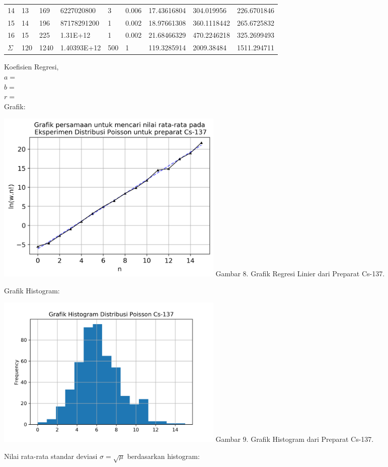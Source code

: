 \documentclass{article}
\begin{document}
\begin{longtable}{@{}lllllllll@{}}
				14  & 13  & 169                  & 6227020800  & 3   & 0.006 & 17.43616804  & 304.019956                  & 226.6701846  \\
				15  & 14  & 196                  & 87178291200 & 1   & 0.002 & 18.97661308  & 360.1118442                 & 265.6725832  \\
				16  & 15  & 225                  & 1.31E+12    & 1   & 0.002 & 21.68466329  & 470.2246218                 & 325.2699493  \\* \midrule
				$\Sigma$ & 120 & 1240                 & 1.40393E+12 & 500 & 1     & 119.3285914  & 2009.38484                  & 1511.294711  \\* \bottomrule
			\end{longtable}
			\hspace{-0.6cm}Koefisien Regresi, \\
			$a = $ \\
			$b = $ \\
			$r = $ \\
			Grafik: 
			\begin{center}
				\includegraphics[width=110mm]{Data/Cs-137-Graph.png}
				Gambar 8. Grafik Regresi Linier dari Preparat Cs-137.
			\end{center}
			Grafik Histogram:
			\begin{center}
				\includegraphics[width=110mm]{Data/Cs-137.png}
				Gambar 9. Grafik Histogram dari Preparat Cs-137.
			\end{center} 
			Nilai rata-rata standar deviasi $\sigma = \sqrt{\mu}$ berdasarkan histogram:\\
		
\end{document}
